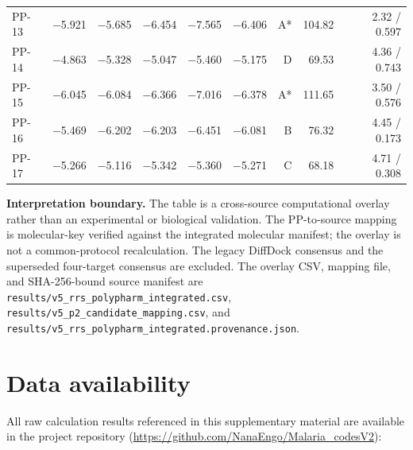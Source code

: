 \documentclass[journal=jcisd8,manuscript=suppinfo]{achemso}
\begin{document}
\begin{table}[!htbp]
{\begin{tabular}{lrrrrrrrr}
PP-13 & \num{-5.921} & \num{-5.685} & \num{-6.454} & \num{-7.565} & \num{-6.406} & A* & \num{104.82} & \num{2.32} / \num{0.597} \\
PP-14 & \num{-4.863} & \num{-5.328} & \num{-5.047} & \num{-5.460} & \num{-5.175} & D & \num{69.53} & \num{4.36} / \num{0.743} \\
PP-15 & \num{-6.045} & \num{-6.084} & \num{-6.366} & \num{-7.016} & \num{-6.378} & A* & \num{111.65} & \num{3.50} / \num{0.576} \\
PP-16 & \num{-5.469} & \num{-6.202} & \num{-6.203} & \num{-6.451} & \num{-6.081} & B & \num{76.32} & \num{4.45} / \num{0.173} \\
PP-17 & \num{-5.266} & \num{-5.116} & \num{-5.342} & \num{-5.360} & \num{-5.271} & C & \num{68.18} & \num{4.71} / \num{0.308} \\
\bottomrule
\end{tabular}%
}
\end{table}

\noindent\textbf{Interpretation boundary.} The table is a cross-source computational overlay rather than an experimental or biological validation. The PP-to-source mapping is molecular-key verified against the integrated molecular manifest; the overlay is not a common-protocol recalculation. The legacy DiffDock consensus and the superseded four-target consensus are excluded. The overlay CSV, mapping file, and SHA-256-bound source manifest are \texttt{results/v5\_rrs\_polypharm\_integrated.csv}, \texttt{results/v5\_p2\_candidate\_mapping.csv}, and \texttt{results/v5\_rrs\_polypharm\_integrated.provenance.json}.

\section*{Data availability}

All raw calculation results referenced in this supplementary material are available in the project repository (\url{https://github.com/NanaEngo/Malaria_codesV2}):
\end{document}
